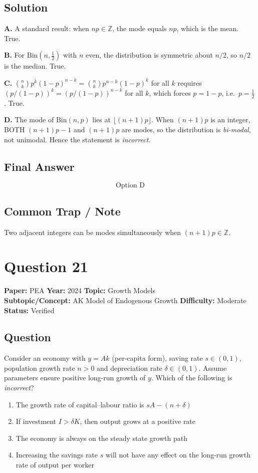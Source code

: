 \documentclass[11pt]{article}
\begin{document}
\subsection*{Solution}
\textbf{A.} A standard result: when $np\in\mathbb{Z}$, the mode equals $np$, which is the mean. True.

\textbf{B.} For $\text{Bin}(n,\tfrac12)$ with $n$ even, the distribution is symmetric about $n/2$, so $n/2$ is the median. True.

\textbf{C.} $\binom{n}{k}p^{k}(1-p)^{n-k}=\binom{n}{k}p^{n-k}(1-p)^{k}$ for all $k$ requires $(p/(1-p))^{k}=(p/(1-p))^{n-k}$ for all $k$, which forces $p=1-p$, i.e.\ $p=\tfrac12$. True.

\textbf{D.} The mode of $\text{Bin}(n,p)$ lies at $\lfloor(n+1)p\rfloor$. When $(n+1)p$ is an integer, BOTH $(n+1)p-1$ and $(n+1)p$ are modes, so the distribution is \emph{bi-modal}, not unimodal. Hence the statement is \emph{incorrect}.

\subsection*{Final Answer}
\[
\boxed{\text{Option D}}
\]

\subsection*{Common Trap / Note}
Two adjacent integers can be modes simultaneously when $(n+1)p\in\mathbb{Z}$.

\section*{Question 21}
\textbf{Paper:} PEA \quad \textbf{Year:} 2024 \quad \textbf{Topic:} Growth Models \\
\textbf{Subtopic/Concept:} AK Model of Endogenous Growth \quad \textbf{Difficulty:} Moderate \quad \textbf{Status:} Verified

\subsection*{Question}
Consider an economy with $y=Ak$ (per-capita form), saving rate $s\in(0,1)$, population growth rate $n>0$ and depreciation rate $\delta\in(0,1)$. Assume parameters ensure positive long-run growth of $y$. Which of the following is \emph{incorrect}?
\begin{enumerate}[label=(\Alph*)]
\item The growth rate of capital--labour ratio is $sA-(n+\delta)$
\item If investment $I>\delta K$, then output grows at a positive rate
\item The economy is always on the steady state growth path
\item Increasing the savings rate $s$ will not have any effect on the long-run growth rate of output per worker
\end{enumerate}
\end{document}
